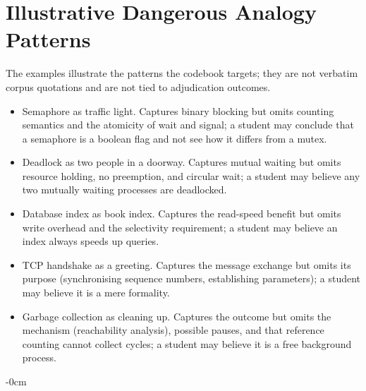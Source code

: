 \documentclass[journal,article,submit,pdftex,moreauthors]{Definitions/mdpi}
\begin{document}
\section[\appendixname~\thesection]{Illustrative Dangerous Analogy Patterns}
\label{appendix:analogies}

The examples illustrate the patterns the codebook targets; they are not verbatim corpus quotations and are not tied to adjudication outcomes.
\begin{itemize}[leftmargin=*, itemsep=2pt]
    \item Semaphore as traffic light. Captures binary blocking but omits counting semantics and the atomicity of wait and signal; a student may conclude that a semaphore is a boolean flag and not see how it differs from a mutex.
    \item Deadlock as two people in a doorway. Captures mutual waiting but omits resource holding, no preemption, and circular wait; a student may believe any two mutually waiting processes are deadlocked.
    \item Database index as book index. Captures the read-speed benefit but omits write overhead and the selectivity requirement; a student may believe an index always speeds up queries.
    \item TCP handshake as a greeting. Captures the message exchange but omits its purpose (synchronising sequence numbers, establishing parameters); a student may believe it is a mere formality.
    \item Garbage collection as cleaning up. Captures the outcome but omits the mechanism (reachability analysis), possible pauses, and that reference counting cannot collect cycles; a student may believe it is a free background process.
\end{itemize}

\begin{adjustwidth}{-\extralength}{0cm}

\PublishersNote{}
\end{adjustwidth}
\end{document}
